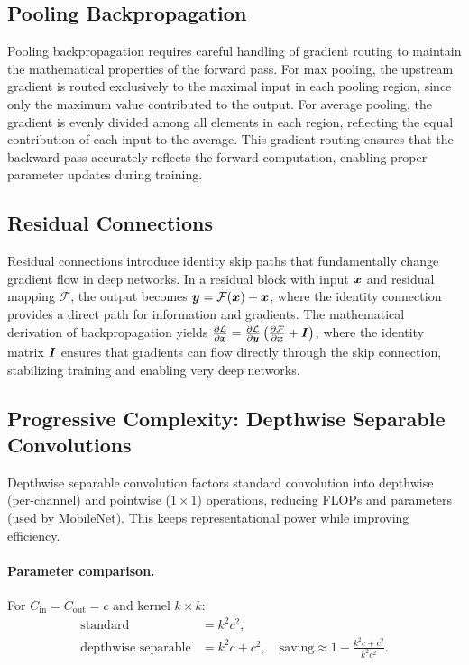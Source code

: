 \subsection{Pooling Backpropagation}
Pooling backpropagation requires careful handling of gradient routing to maintain the mathematical properties of the forward pass. For max pooling, the upstream gradient is routed exclusively to the maximal input in each pooling region, since only the maximum value contributed to the output. For average pooling, the gradient is evenly divided among all elements in each region, reflecting the equal contribution of each input to the average. This gradient routing ensures that the backward pass accurately reflects the forward computation, enabling proper parameter updates during training.

\subsection{Residual Connections}
Residual connections introduce identity skip paths that fundamentally change gradient flow in deep networks. In a residual block with input $\boldsymbol{x}$ and residual mapping $\mathcal{F}$, the output becomes $\boldsymbol{y}=\mathcal{F}(\boldsymbol{x})+\boldsymbol{x}$, where the identity connection provides a direct path for information and gradients. The mathematical derivation of backpropagation yields $\frac{\partial \mathcal{L}}{\partial \boldsymbol{x}}=\frac{\partial \mathcal{L}}{\partial \boldsymbol{y}}\left(\frac{\partial \mathcal{F}}{\partial \boldsymbol{x}}+\boldsymbol{I}\right)$, where the identity matrix $\boldsymbol{I}$ ensures that gradients can flow directly through the skip connection, stabilizing training and enabling very deep networks.\cite{He2016}

\subsection{Progressive Complexity: Depthwise Separable Convolutions}
Depthwise separable convolution factors standard convolution into depthwise (per-channel) and pointwise ($1\times1$) operations, reducing FLOPs and parameters (used by MobileNet). This keeps representational power while improving efficiency.

\paragraph{Parameter comparison.} For $C_{\text{in}}=C_{\text{out}}=c$ and kernel $k\times k$:
\begin{align}
\text{standard} &= k^2 c^2,\\
\text{depthwise separable} &= k^2 c + c^2,\quad \text{saving} \approx 1 - \frac{k^2 c + c^2}{k^2 c^2}.
\end{align}


